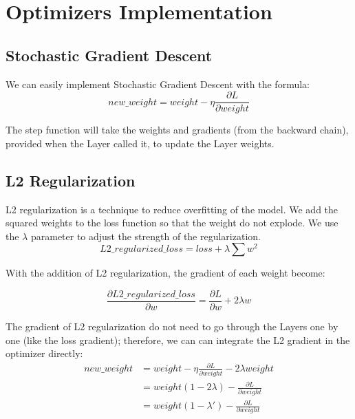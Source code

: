 \documentclass[conference]{IEEEtran}
\begin{document}
\section{Optimizers Implementation}
\subsection{Stochastic Gradient Descent}
We can easily implement Stochastic Gradient Descent with the formula:
\begin{equation}
new\_weight = weight - \eta \frac{\partial L}{\partial weight}
\end{equation}

The step function will take the weights and gradients (from the backward chain), provided when the Layer called it, to update the Layer weights.

\subsection{L2 Regularization}
L2 regularization is a technique to reduce overfitting of the model. We add the squared weights to the loss function so that the weight do not explode. We use the \(\lambda\) parameter to adjust the strength of the regularization.
\begin{equation}
L2\_regularized\_loss = loss + \lambda\sum w^2
\end{equation}

With the addition of L2 regularization, the gradient of each weight become:

\begin{equation}
\frac{\partial L2\_regularized\_loss}{\partial w}  = \frac{\partial L}{\partial w} + 2\lambda w
\end{equation}

The gradient of L2 regularization do not need to go through the Layers one by one (like the loss gradient); therefore, we can can integrate the L2 gradient in the optimizer directly:
\begin{equation}
\begin{split}
new\_weight &=  weight - \eta \frac{\partial L}{\partial weight} - 2\lambda weight \\
&= weight(1-2\lambda) - \frac{\partial L}{\partial weight}\\
&= weight(1-\lambda') - \frac{\partial L}{\partial weight}\\
\end{split}
\end{equation}
\end{document}
